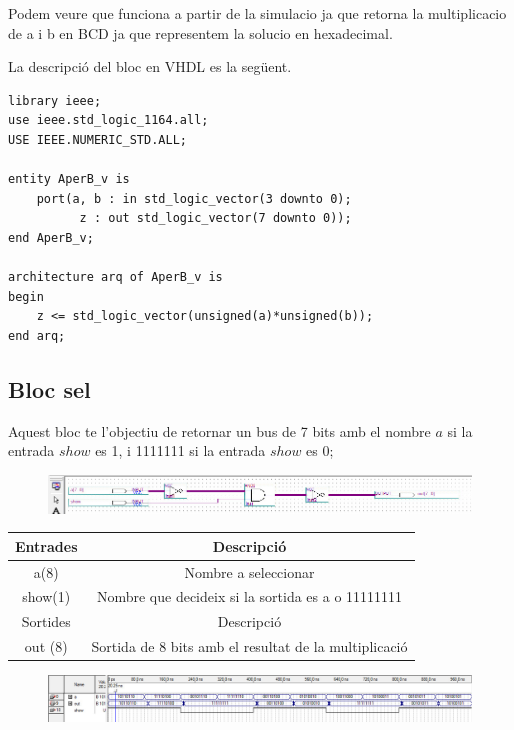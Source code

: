 \documentclass[12pt, a4papre]{article}
\begin{document}
	Podem veure que funciona a partir de la simulacio ja que retorna la multiplicacio de a i b en BCD ja que representem la solucio en hexadecimal.
	
	La descripció del bloc en VHDL es la següent.
	
	\begin{lstlisting}[style=vhdl, frame=single, basicstyle=\small]
library ieee;
use ieee.std_logic_1164.all;
USE IEEE.NUMERIC_STD.ALL;

entity AperB_v is
	port(a, b : in std_logic_vector(3 downto 0);
		  z : out std_logic_vector(7 downto 0));
end AperB_v;

architecture arq of AperB_v is
begin
	z <= std_logic_vector(unsigned(a)*unsigned(b));
end arq;
\end{lstlisting}
	
	\subsection{Bloc sel}
	
	Aquest bloc te l'objectiu de retornar un bus de 7 bits amb el nombre $a$ si la entrada $show$ es 1, i 1111111 si la entrada $show$ es 0;
	\begin{figure}[H]
		\begin{center}
		\includegraphics[width=130mm]{SEL.jpeg}
		\end{center}
	\end{figure}
	
	\begin{table}[h!]
		\centering
		 \begin{tabular}{|c | c|} 
			 \hline
			 Entrades & Descripció\\ [0.5ex] 
			 \hline
			 a(8) &  Nombre a seleccionar\\ 
			 show(1) &  Nombre que decideix si la sortida es a o 11111111\\ 
			 \hline\hline
			 Sortides & Descripció\\ [0.5ex] 
			 \hline
			out (8) & Sortida de 8 bits amb el resultat de la multiplicació\\ 
			 \hline
		 \end{tabular}
	\end{table}
	
	\begin{figure}[H]
		\begin{center}
		\includegraphics[width=130mm]{Simulacio_Sel.jpeg}
		\end{center}
	\end{figure}
	
\end{document}
